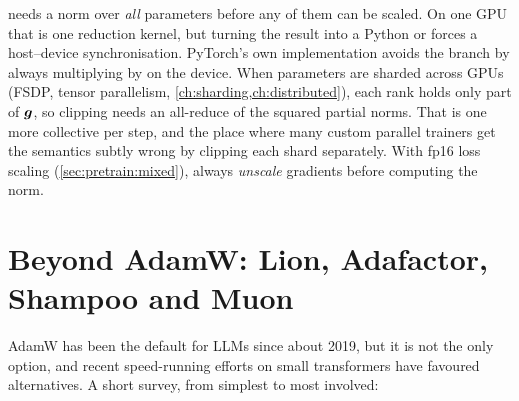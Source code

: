 \begin{systemslens}
 needs a norm over \emph{all} parameters before any of them can be scaled.
On one GPU that is one reduction kernel, but turning the result into a Python  or
 forces a host--device synchronisation. PyTorch's own implementation avoids the
branch by always multiplying by  on the device. When parameters are
sharded across GPUs (FSDP, tensor parallelism, \cref{ch:sharding,ch:distributed}), each rank
holds only part of $\bm{g}$, so clipping needs an all-reduce of the squared partial norms.
That is one more collective per step, and the place where many custom parallel trainers get the
semantics subtly wrong by clipping each shard separately. With fp16 loss scaling
(\cref{sec:pretrain:mixed}), always \emph{unscale} gradients before computing the norm.
\end{systemslens}

\section{Beyond AdamW: Lion, Adafactor, Shampoo and Muon}\label{sec:optim:beyond}

AdamW has been the default for LLMs since about 2019, but it is not the only option, and recent
speed-running efforts on small transformers have favoured alternatives. A short survey, from
simplest to most involved:


